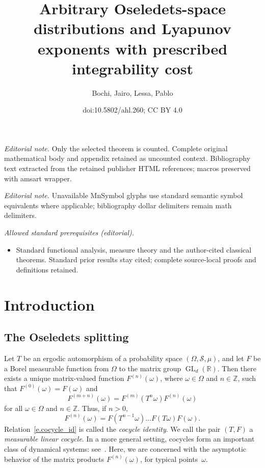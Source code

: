 \documentclass[10pt]{amsart}
\title{Arbitrary Oseledets-space distributions and Lyapunov exponents with prescribed integrability cost}
\author{Bochi, Jairo, Lessa, Pablo}
\date{doi:10.5802/ahl.260; CC BY 4.0}
\theoremstyle{definition}\newtheorem{defi}[theo]{Definition}\newtheorem{rema}[theo]{Remark}\newtheorem{exam}[theo]{Example}\newtheorem{exem}[theo]{Example}\newtheorem{nota}[theo]{Notation}
\newcommand{\Z}{\mathbb{Z}}
\newcommand{\R}{\mathbb{R}}
\newcommand{\clS}{\mathcal{S}}
\DeclareMathOperator{\GL}{GL}
\begin{document}
\maketitle
\noindent\textit{Editorial note.} Only the selected theorem is counted. Complete original mathematical body and appendix retained as uncounted context. Bibliography text extracted from the retained publisher HTML references; macros preserved with amsart wrapper.\par\medskip
\noindent\textit{Editorial note.} Unavailable MnSymbol glyphs use standard semantic symbol equivalents where applicable; bibliography dollar delimiters remain math delimiters.\par\medskip
\noindent\textit{Allowed standard prerequisites (editorial).}\begin{itemize}
\item Standard functional analysis, measure theory and the author-cited classical theorems. Standard prior results stay cited; complete source-local proofs and definitions retained.
\end{itemize}\medskip

\section{Introduction}

\subsection{The Oseledets splitting}

Let $T$ be an ergodic automorphism of a probability space $(\Omega,\clS,\mu)$, and let $F$ be a Borel measurable function from $\Omega$ to the matrix group $\GL_d(\R)$. Then there exists a unique matrix-valued function $F^{(n)}(\omega)$, where $\omega \in \Omega$ and $n \in \Z$, such that $F^{(0)}(\omega) = F(\omega)$ and
\begin{equation}\label{e.cocycle_id}
F^{(m+n)}(\omega) = F^{(m)}(T^n \omega) F^{(n)}(\omega)
\end{equation}
for all $\omega \in \Omega$ and $n \in \Z$. Thus, if $n > 0$,
\begin{equation}
F^{(n)}(\omega) = F\left(T^{n-1} \omega\right)\dots F(T\omega) F(\omega).
\end{equation}
Relation~\eqref{e.cocycle_id} is called the \emph{cocycle identity}. We call the pair $(T,F)$ a \emph{measurable linear cocycle}. In a more general setting, cocycles form an important class of dynamical systems: see~\cite[Section~1.3.k]{HK}. Here, we are concerned with the asymptotic behavior of the matrix products $F^{(n)}(\omega)$, for typical points~$\omega$.
\end{document}
